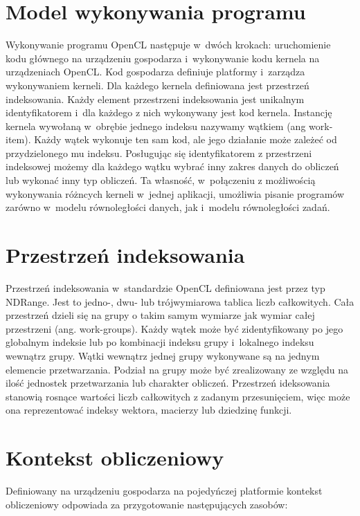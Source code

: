 \section{Model wykonywania programu}\label{sec:mwp}

Wykonywanie programu OpenCL następuje w~dwóch krokach: uruchomienie kodu głównego na urządzeniu gospodarza i~wykonywanie kodu kernela na urządzeniach OpenCL. Kod gospodarza definiuje platformy i~zarządza wykonywaniem kerneli. Dla każdego kernela definiowana jest przestrzeń indeksowania. Każdy element przestrzeni indeksowania jest unikalnym identyfikatorem i~dla każdego z nich wykonywany jest kod kernela. Instancję kernela wywołaną w~obrębie jednego indeksu nazywamy wątkiem (ang work-item). Każdy wątek wykonuje ten sam kod, ale jego działanie może zależeć od przydzielonego mu indeksu. Posługując się identyfikatorem z przestrzeni indeksowej możemy dla każdego wątku wybrać inny zakres danych do obliczeń lub wykonać inny typ obliczeń. Ta własność, w~połączeniu z możliwością wykonywania różncych kerneli w~jednej aplikacji, umożliwia pisanie programów zarówno w~modelu równoległości danych, jak i~modelu równoległości zadań.

\section{Przestrzeń indeksowania}\label{sec:OpenC5L}

Przestrzeń indeksowania w~standardzie OpenCL definiowana jest przez typ NDRange. Jest to jedno-, dwu- lub trójwymiarowa tablica liczb całkowitych. Cała przestrzeń dzieli się na grupy o takim samym wymiarze jak wymiar całej przestrzeni (ang. work-groups). Każdy wątek może być zidentyfikowany po jego globalnym indeksie lub po kombinacji indeksu grupy i~lokalnego indeksu wewnątrz grupy. Wątki wewnątrz jednej grupy wykonywane są na jednym elemencie przetwarzania. Podział na grupy może być zrealizowany ze względu na ilość jednostek przetwarzania lub charakter obliczeń. Przestrzeń ideksowania stanowią rosnące wartości liczb całkowitych z zadanym przesunięciem, więc może ona reprezentować indeksy wektora, macierzy lub dziedzinę funkcji.

\section{Kontekst obliczeniowy}\label{sec:OpenC2L}

Definiowany na urządzeniu gospodarza na pojedyńczej platformie kontekst obliczeniowy odpowiada za przygotowanie następujących zasobów:

